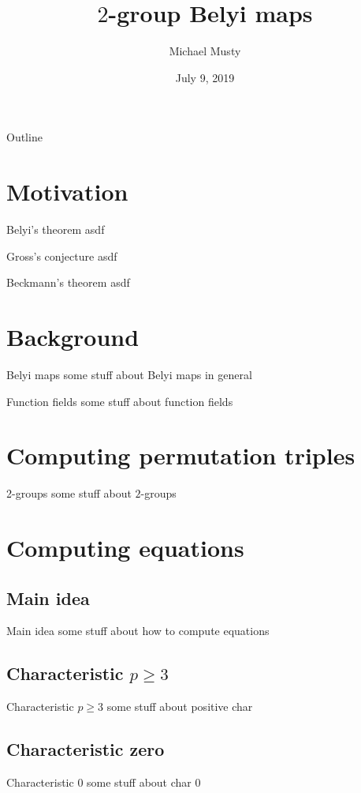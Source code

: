 \documentclass[xcolor=dvipsnames]{beamer}
\title{$2$-group Belyi maps}
\author{Michael Musty}
\date{July 9, 2019}
\institute{Dartmouth College}
\theoremstyle{plain}
\begin{document}
  \maketitle
  \begin{frame}{Outline}
    \tableofcontents
  \end{frame}
  \section{Motivation}{
    \begin{frame}{Belyi's theorem}
      asdf
    \end{frame}
    \begin{frame}{Gross's conjecture}
      asdf
    \end{frame}
    \begin{frame}{Beckmann's theorem}
      asdf
    \end{frame}
  }
  \section{Background}{
    \begin{frame}{Belyi maps}
      some stuff about Belyi maps in general
    \end{frame}
    \begin{frame}{Function fields}
      some stuff about function fields
    \end{frame}
  }
  \section{Computing permutation triples}{
    \begin{frame}{2-groups}
      some stuff about $2$-groups
    \end{frame}
  }
  \section{Computing equations}{
    \subsection{Main idea}{
      \begin{frame}{Main idea}
        some stuff about how to compute equations
      \end{frame}
    }
    \subsection{Characteristic $p\geq 3$}{
      \begin{frame}{Characteristic $p\geq 3$}
        some stuff about positive char
      \end{frame}
    }
    \subsection{Characteristic zero}{
      \begin{frame}{Characteristic $0$}
        some stuff about char $0$
      \end{frame}
    }
  }
\end{document}
